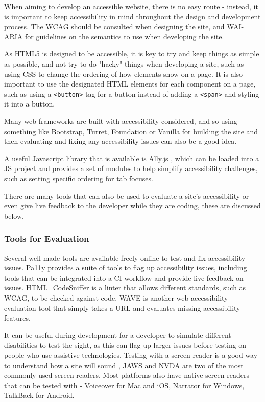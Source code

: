 \documentclass[ %
                    author={Aleena Baig},
                supervisor={Dr Simon Lock},
                    degree={BSc},
                     title={On Making Web Accessible Graphs},
                  subtitle={},
                      year={2019} ]{dissertation}
\begin{document}
When aiming to develop an accessible website, there is no easy route - instead, it is important to keep accessibility in mind throughout the design and development process. The WCAG should be consulted when designing the site, and WAI-ARIA for guidelines on the semantics to use when developing the site.

As HTML5 is designed to be accessible, it is key to try and keep things as simple as possible, and not try to do "hacky" things when developing a site, such as using CSS to change the ordering of how elements show on a page. It is also important to use the designated HTML elements for each component on a page, such as using a \texttt{<button>} tag for a button instead of adding a \texttt{<span>} and styling it into a button.

Many web frameworks are built with accessibility considered, and so using something like Bootstrap, Turret, Foundation or Vanilla for building the site and then evaluating and fixing any accessibility issues can also be a good idea.

A useful Javascript library that is available is Ally.js \cite{allyjs}, which can be loaded into a JS project and provides a set of modules to help simplify accessibility challenges, such as setting specific ordering for tab focuses.

There are many tools that can also be used to evaluate a site's accessibility or even give live feedback to the developer while they are coding, these are discussed below.

\subsubsection{Tools for Evaluation}

Several well-made tools are available freely online to test and fix accessibility issues. Pa11y \cite{pa11y} provides a suite of tools to flag up accessibility issues, including tools that can be integrated into a CI workflow and provide live feedback on issues. HTML\_CodeSniffer \cite{codesniffer} is a linter that allows different standards, such as WCAG, to be checked against code. WAVE \cite{wave} is another web accessibility evaluation tool that simply takes a URL and evaluates missing accessibility features.

It can be useful during development for a developer to simulate different disabilities to test the sight, as this can flag up larger issues before testing on people who use assistive technologies. Testing with a screen reader is a good way to understand how a site will sound , JAWS and NVDA are two of the most commonly-used screen readers. Most platforms also have native screen-readers that can be tested with - Voiceover for Mac and iOS, Narrator for Windows, TalkBack for Android.
\end{document}
